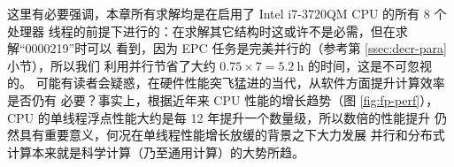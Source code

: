 \begin{figure}[htbp!]\bfcmd
{}
\end{figure}

这里有必要强调，本章所有求解均是在启用了 Intel i7-3720QM CPU 的所有 8 个处理器
线程的前提下进行的：在求解其它结构时这或许不是必需，但在求解“0000219”时可以
看到，因为 EPC 任务是完美并行的（参考第 \ref{ssec:decr-para} 小节），所以我们
利用并行节省了大约 $0.75 \times 7 = \SI{5.2}{\hour}$ 的时间，这是不可忽视的。
可能有读者会疑惑，在硬件性能突飞猛进的当代，从软件方面提升计算效率是否仍有
必要？事实上，根据近年来 CPU 性能的增长趋势（图 \ref{fig:fp-perf}），%
CPU 的单线程浮点性能大约是每 12 年提升一个数量级，所以数倍的性能提升
仍然具有重要意义，何况在单线程性能增长放缓的背景之下大力发展
并行和分布式计算本来就是科学计算（乃至通用计算）的大势所趋。

\begin{figure}[htbp!]
\end{figure}

